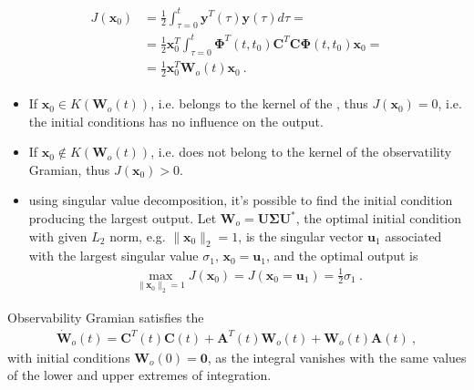 \documentclass[letterpaper,10pt,english]{jupyterBook}
\begin{document}
\begin{equation*}
\begin{split}\begin{aligned}
 J(\mathbf{x}_0)
 & = \frac{1}{2} \int_{\tau=0}^{t} \mathbf{y}^T(\tau) \mathbf{y}(\tau) d \tau = \\
 & = \frac{1}{2} \mathbf{x}_0^T \int_{\tau=0}^{t} \boldsymbol\Phi^T(t,t_0) \mathbf{C}^T \mathbf{C} \boldsymbol\Phi(t,t_0) \mathbf{x}_0 = \\
 & = \frac{1}{2} \mathbf{x}_0^T \mathbf{W}_o(t) \mathbf{x}_0 \ .
\end{aligned}\end{split}
\end{equation*}\begin{itemize}
\item {} 
\sphinxAtStartPar
If \(\mathbf{x}_0 \in K(\mathbf{W}_o(t))\), i.e. belongs to the kernel of the , thus \(J(\mathbf{x}_0) = 0\), i.e. the initial conditions has no influence on the output.

\item {} 
\sphinxAtStartPar
If \(\mathbf{x}_0 \notin K(\mathbf{W}_o(t))\), i.e. does not belong to the kernel of the observatility Gramian, thus \(J(\mathbf{x}_0) > 0\).

\item {} 
\sphinxAtStartPar
using singular value decomposition, it’s possible to find the initial condition producing the largest output. Let \(\mathbf{W}_o = \mathbf{U} \boldsymbol\Sigma \mathbf{U}^*\), the optimal initial condition with given \(L_2\) norm, e.g. \(\|\mathbf{x}_0\|_2 = 1\), is the singular vector \(\mathbf{u}_1\) associated with the largest singular value \(\sigma_1\), \(\mathbf{x}_0 = \mathbf{u}_1\), and the optimal output is
\begin{equation*}
\begin{split}\max_{\|\mathbf{x}_0\|_2 = 1} J(\mathbf{x}_0) = J(\mathbf{x}_0 = \mathbf{u}_1) = \frac{1}{2} \sigma_1 \ .\end{split}
\end{equation*}
\end{itemize}

\sphinxAtStartPar
Observability Gramian satisfies the {\hyperref[\detokenize{ch/system-theory/lyapunov-equation:lyapunov-eq}]{}}
\begin{equation*}
\begin{split}
 \dot{\mathbf{W}}_o(t) = \mathbf{C}^T(t) \mathbf{C}(t) + \mathbf{A}^T(t) \mathbf{W}_o(t) + \mathbf{W}_o(t) \mathbf{A}(t) \ ,
\end{split}
\end{equation*}
\sphinxAtStartPar
with initial conditions \(\mathbf{W}_o(0) = \mathbf{0}\), as the integral vanishes with the same values of the lower and upper extremes of integration.
\end{document}
